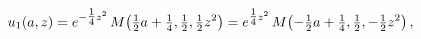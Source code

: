 \[u_{1}(a,z)=e^{-\tfrac{1}{4}z^{2}}\mathop{M\/}\nolimits\!\left(\tfrac{1}{2}a+%
\tfrac{1}{4},\tfrac{1}{2},\tfrac{1}{2}z^{2}\right)=e^{\tfrac{1}{4}z^{2}}%
\mathop{M\/}\nolimits\!\left(-\tfrac{1}{2}a+\tfrac{1}{4},\tfrac{1}{2},-\tfrac{%
1}{2}z^{2}\right),\]